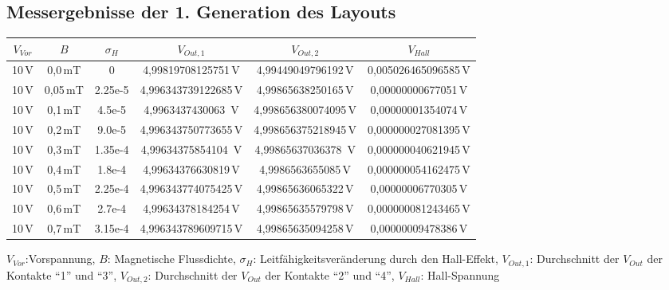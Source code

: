 \documentclass[12pt, a4paper]{article}
\renewcommand{\footnotesize}{\fontsize{10pt}{12pt}\selectfont}
\begin{document}
	\subsection*{Messergebnisse der 1. Generation des Layouts}
		\begin{center}
			\begin{tabular}{||c c c c c c||} 
				\hline
				$V_{Vor}$ & $B$ & $\sigma_H$ & $V_{Out,1}$ & $V_{Out,2}$ & $V_{Hall}$\\ [0.5ex] 
				\hline\hline
				10\,V & 0,0\,mT & 0       & 4,99819708125751\,V  & 4,99449049796192\,V   &  0,005026465096585\,V  \\ 
				\hline
				10\,V & 0,05\,mT& 2.25e-5 & 4,996343739122685\,V &  4,99865638250165\,V  &  0,00000000677051\,V   \\
				\hline
				10\,V & 0,1\,mT & 4.5e-5  & 4,9963437430063  \,V & 4,998656380074095\,V  &  0,00000001354074\,V   \\
				\hline
				10\,V & 0,2\,mT & 9.0e-5  & 4,996343750773655\,V & 4,998656375218945\,V  &  0,000000027081395\,V  \\
				\hline
				10\,V & 0,3\,mT & 1.35e-4 & 4,99634375854104 \,V & 4,99865637036378 \,V  &  0,000000040621945\,V  \\  
				\hline
				10\,V & 0,4\,mT & 1.8e-4  & 4,99634376630819\,V  & 4,9986563655085\,V    &  0,000000054162475\,V  \\
				\hline
				10\,V & 0,5\,mT & 2.25e-4 & 4,996343774075425\,V & 4,99865636065322\,V   &  0,00000006770305\,V   \\
				\hline
				10\,V & 0,6\,mT & 2.7e-4  & 4,99634378184254\,V  & 4,99865635579798\,V   &  0,000000081243465\,V  \\
				\hline
				10\,V & 0,7\,mT & 3.15e-4 & 4,996343789609715\,V & 4,99865635094258\,V   &  0,00000009478386\,V   \\ [1ex] 
				\hline
			\end{tabular}
		\end{center}
		\vspace{-0.8em}
		\begin{center}
			\footnotesize
			$V_{Vor}$:Vorspannung, $B$: Magnetische Flussdichte, $\sigma_H$: Leitfähigkeitsveränderung durch den Hall-Effekt, $V_{Out,1}$: Durchschnitt der $V_{Out}$ der Kontakte ``1'' und ``3'', $V_{Out,2}$: Durchschnitt der $V_{Out}$ der Kontakte ``2'' und ``4'', $V_{Hall}$: Hall-Spannung
		\end{center}
	
\end{document}
